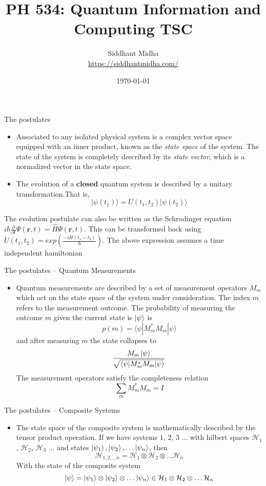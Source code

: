 \documentclass[handout]{beamer}
\title{PH 534: Quantum Information and Computing TSC}
\author[Siddhant Midha]{\texorpdfstring{Siddhant Midha\\\color{red}\url{https://siddhantmidha.com/}\color{black}}{Siddhant Midha}}
\date{\today}
\newcommand{\Hilb}{\mathcal{H}}
\begin{document}
\frame{\titlepage} 
\begin{frame}{The postulates}
\begin{itemize}
\item Associated to any isolated physical system is a complex vector space equipped with an inner product, known as the \textit{state space} of the system. The state of the system is completely described by its \textit{state vector}, which is a normalized vector in the state space.\pause
\item The evolution of a \textbf{closed} quantum system is described by a unitary transformation.\pause That is,
\[|\psi(t_1)\rangle = U(t_1,t_2)|\psi(t_2)\rangle\]\pause
\end{itemize}

The evolution postulate can also be written as the Schrodinger equation $i\hbar \frac{\partial}{\partial t}\Psi(\mathbf{r},t) = \hat H \Psi(\mathbf{r},t)$. \pause This can be transformed back using $U(t_1,t_2)= exp(\frac{-iH(t_1-t_2)}{\hbar})$.
\color{red} The above expression assumes a time independent hamiltonian\color{black}
\end{frame}

\begin{frame}{The postulates -- Quantum Measurements}
\begin{itemize}
\item Quantum measurements are described by a set of measurement operators $M_m$ which act on the state space of the system under consideration. \pause The index $m$ refers to the measurement outcome. \pause The probability of measuring the outcome $m$ given the current state is $\ket{\psi}$ is\pause
\[p(m) = \langle\psi|M_m^*M_m|\psi\rangle\]\pause
and after measuring $m$ the state collapses to \pause
\[\frac{M_m\ket{\psi}}{\sqrt{\langle\psi|M_m^*M_m|\psi\rangle}}\]\pause
The measurement operators satisfy the completeness relation\pause
\[\sum_{m}M_m^*M_m = I\]\pause
\end{itemize}
\end{frame}

\begin{frame}{The postulates -- Composite Systems}
\begin{itemize}
\item The state space of the composite system is mathematically described by the tensor product operation. \pause If we have systems $1$, $2$, $3$ ... with hilbert spaces $\Hilb_1$, $\Hilb_2$, $\Hilb_3$ ... and states $\ket{\psi_1},\ket{\psi_2},\dots\ket{\psi_n}$, then \pause
\[\Hilb_{1,2,\dots n} = \Hilb_1\otimes\Hilb_2\otimes \dots \Hilb_n\]\pause
With the state of the composite system\pause
\[\ket{\psi} = \ket{\psi_1}\otimes\ket{\psi_2}\otimes \dots \ket{\psi_n} \in \Hilb_1\otimes\Hilb_2\otimes \dots \Hilb_n\]
\end{itemize}
\end{frame}
\end{document}
